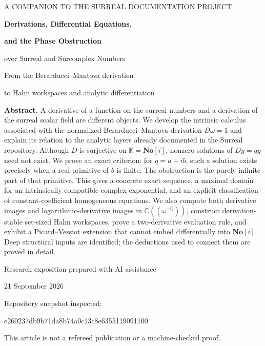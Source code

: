 \documentclass[11pt,a4paper]{article}
\numberwithin{equation}{section}
\theoremstyle{definition}
\theoremstyle{remark}
\newcommand{\No}{\mathbf{No}}
\newcommand{\K}{\mathbb K}
\newcommand{\C}{\mathbb C}
\newcommand{\Q}{\mathbb Q}
\begin{document}
\begin{titlepage}
\centering
\vspace*{12mm}
{\small\sffamily\color{Accent} A COMPANION TO THE SURREAL DOCUMENTATION PROJECT\par}
\vspace{12mm}
{\LARGE\bfseries\color{Ink} Derivations, Differential Equations,\par}
\vspace{3mm}
{\LARGE\bfseries\color{Ink} and the Phase Obstruction\par}
\vspace{5mm}
{\Large over Surreal and Surcomplex Numbers\par}
\vspace{9mm}
{\large From the Berarducci--Mantova derivation\par
 to Hahn workspaces and analytic differentiation\par}
\vspace{13mm}
\begin{minipage}{0.91\textwidth}
\small
\textbf{Abstract.}
A derivative of a function on the surreal numbers and a derivation of the
surreal scalar field are different objects. We develop the intrinsic
calculus associated with the normalized Berarducci--Mantova derivation
$D\omega=1$ and explain its relation to the analytic layers already documented
in the Surreal repository. Although $D$ is surjective on
$\K=\No[i]$, nonzero solutions of $Dy=qy$ need not exist. We prove an exact
criterion: for $q=a+ib$, such a solution exists precisely when a real
primitive of $b$ is finite. The obstruction is the purely infinite part of
that primitive. This gives a concrete exact sequence, a maximal domain for
an intrinsically compatible complex exponential, and an explicit
classification of constant-coefficient homogeneous equations. We also compute
both derivative images and logarithmic-derivative images in
$\C((\omega^{-\Q}))$, construct derivation-stable set-sized Hahn workspaces,
prove a two-derivative evaluation rule, and exhibit a Picard--Vessiot extension
that cannot embed differentially into $\No[i]$. Deep structural inputs are
identified; the deductions used to connect them are proved in detail.
\end{minipage}
\vfill
{\small Research exposition prepared with AI assistance\par}
\vspace{3mm}
{\small 21 September 2026\par}
\vspace{5mm}
{\footnotesize Repository snapshot inspected:\par}
{\footnotesize\ttfamily e260237db9b71da8b74a0c13c8e6355119091100\par}
\vspace{2mm}
{\footnotesize This article is not a refereed publication or a machine-checked proof.\par}
\end{titlepage}
\setcounter{tocdepth}{2}
\tableofcontents
\clearpage
{}
\end{document}
